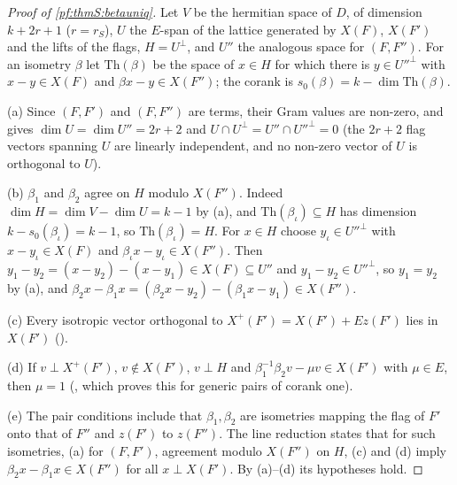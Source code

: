 \begin{proof}[Proof of \cref{pf:thmS:betauniq}]
Let $V$ be the hermitian space of $D$, of dimension $k+2r+1$ ($r=r_S$), $U$ the $E$-span of the lattice generated by $X(F)$,
$X(F')$ and the lifts of the flags, $H=U^\perp$, and $U''$ the analogous space for $(F,F'')$. For an isometry $\beta$ let
$\mathrm{Th}(\beta)$ be the space of $x\in H$ for which there is $y\in U''^\perp$ with $x-y\in X(F)$ and $\beta x-y\in X(F'')$; the
corank is $s_0(\beta)=k-\dim\mathrm{Th}(\beta)$.

(a) Since $(F,F')$ and $(F,F'')$ are terms, their Gram values are non-zero, and
 gives $\dim U=\dim U''=2r+2$ and
$U\cap U^\perp=U''\cap U''^\perp=0$ (the $2r+2$ flag vectors spanning $U$ are linearly independent, and no non-zero vector of $U$
is orthogonal to $U$).

(b) $\beta_1$ and $\beta_2$ agree on $H$ modulo $X(F'')$. Indeed $\dim H=\dim V-\dim U=k-1$ by (a), and
$\mathrm{Th}(\beta_\iota)\subseteq H$ has dimension $k-s_0(\beta_\iota)=k-1$, so $\mathrm{Th}(\beta_\iota)=H$. For $x\in H$ choose
$y_\iota\in U''^\perp$ with $x-y_\iota\in X(F)$ and $\beta_\iota x-y_\iota\in X(F'')$. Then $y_1-y_2=(x-y_2)-(x-y_1)\in
X(F)\subseteq U''$ and $y_1-y_2\in U''^\perp$, so $y_1=y_2$ by (a), and $\beta_2x-\beta_1x=(\beta_2x-y_2)-(\beta_1x-y_1)\in X(F'')$.

(c) Every isotropic vector orthogonal to $X^+(F')=X(F')+Ez(F')$ lies in $X(F')$
().

(d) If $v\perp X^+(F')$, $v\notin X(F')$, $v\perp H$ and $\beta_1^{-1}\beta_2v-\mu v\in X(F')$ with $\mu\in E$, then $\mu=1$
(, which proves this for generic pairs of corank one).

(e) The pair conditions include that $\beta_1,\beta_2$ are isometries mapping the flag of $F'$ onto that of $F''$ and $z(F')$ to
$z(F'')$. The line reduction  states that for such
isometries, (a) for $(F,F')$, agreement modulo $X(F'')$ on $H$, (c) and (d) imply $\beta_2x-\beta_1x\in X(F'')$ for all
$x\perp X(F')$. By (a)--(d) its hypotheses hold.
\end{proof}

